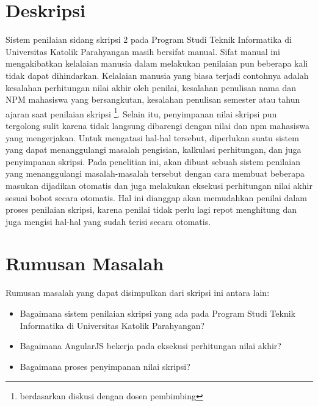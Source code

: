 \documentclass[a4paper,twoside]{article}
\begin{document}
\title{\@judultopik}
\author{\nama \textendash \@npm} 

\newcommand{\nama}{Billy Yanuar}
\newcommand{\@npm}{2012730017}
\newcommand{\@judultopik}{Sistem Penilaian Sidang Skripsi 2 dengan AngularJS} %
\newcommand{\jumpemb}{1} %
\newcommand{\tanggal}{11/02/2016}
\maketitle


\section{Deskripsi}
Sistem penilaian sidang skripsi 2 pada Program Studi Teknik Informatika di Universitas Katolik Parahyangan masih bersifat manual. Sifat manual ini mengakibatkan kelalaian manusia dalam melakukan penilaian pun beberapa kali tidak dapat dihindarkan. Kelalaian manusia yang biasa terjadi contohnya adalah kesalahan perhitungan nilai akhir oleh penilai, kesalahan penulisan nama dan NPM mahasiswa yang bersangkutan, kesalahan penulisan semester atau tahun ajaran saat penilaian skripsi \footnote{berdasarkan diskusi dengan dosen pembimbing}. Selain itu, penyimpanan nilai skripsi pun tergolong sulit karena tidak langsung dibarengi dengan nilai dan npm mahasiswa yang mengerjakan. Untuk mengatasi hal-hal tersebut, diperlukan suatu sistem yang dapat menanggulangi masalah pengisian, kalkulasi perhitungan, dan juga penyimpanan skripsi.
Pada penelitian ini, akan dibuat sebuah sistem penilaian yang menanggulangi masalah-masalah tersebut dengan cara membuat beberapa masukan dijadikan otomatis dan juga melakukan eksekusi perhitungan nilai akhir sesuai bobot secara otomatis. Hal ini dianggap akan memudahkan penilai dalam proses penilaian skripsi, karena penilai tidak perlu lagi repot menghitung dan juga mengisi hal-hal yang sudah terisi secara otomatis.


\section{Rumusan Masalah}
Rumusan masalah yang dapat disimpulkan dari skripsi ini antara lain:
\begin{itemize}
	\item Bagaimana sistem penilaian skripsi yang ada pada Program Studi Teknik Informatika di Universitas Katolik Parahyangan?
	\item Bagaimana AngularJS bekerja pada eksekusi perhitungan nilai akhir?
	\item Bagaimana proses penyimpanan nilai skripsi?
\end{itemize}
\end{document}
